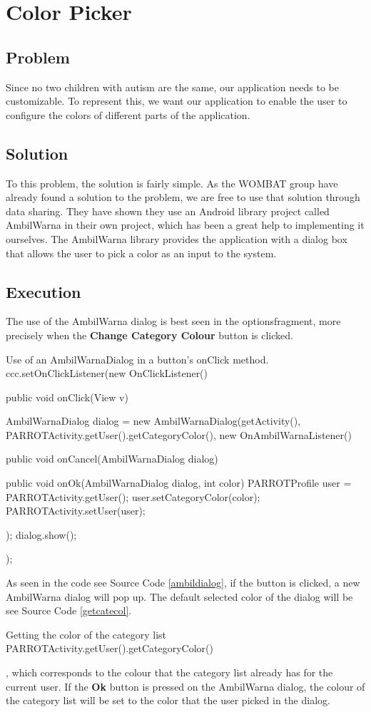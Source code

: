 \section{Color Picker}%
\label{colpic}
\subsection*{Problem}
Since no two children with autism are the same, our application needs to be customizable. To represent this, we want our application to enable the user to configure the colors of different parts of the application.

\subsection*{Solution}
To this problem, the solution is fairly simple. As the WOMBAT group have already found a solution to the problem, we are free to use that solution through data sharing. %
They have shown they use an Android library project called AmbilWarna in their own project, which has been a great help to implementing it ourselves. The AmbilWarna library provides the application with a dialog box that allows the user to pick a color as an input to the system.

\subsection*{Execution}{}
The use of the AmbilWarna dialog is best seen in the optionsfragment, more precisely when the \textbf{Change Category Colour} button is clicked.

\begin{source}[{ambildialog}]{Use of an AmbilWarnaDialog in a button's onClick method.}
		ccc.setOnClickListener(new OnClickListener() {
			public void onClick(View v) {
				AmbilWarnaDialog dialog = new AmbilWarnaDialog(getActivity(),
						PARROTActivity.getUser().getCategoryColor(), new OnAmbilWarnaListener() {
					public void onCancel(AmbilWarnaDialog dialog) {
					}

					public void onOk(AmbilWarnaDialog dialog, int color) {
						PARROTProfile user = PARROTActivity.getUser();
						user.setCategoryColor(color);
						PARROTActivity.setUser(user);
					}
				});
				dialog.show();
			}
		});
\end{source}

As seen in the code see Source Code \ref{ambildialog}, if the button is clicked, a new AmbilWarna dialog will pop up. The default selected color of the dialog will be see Source Code \ref{getcatecol}. 
\begin{source}[{getcatecol}]{Getting the color of the category list}
PARROTActivity.getUser().getCategoryColor()
\end{source}, which corresponds to the colour that the category list already has for the current user.\newline
If the \textbf{Ok} button is pressed on the AmbilWarna dialog, the colour of the category list will be set to the color that the user picked in the dialog.

